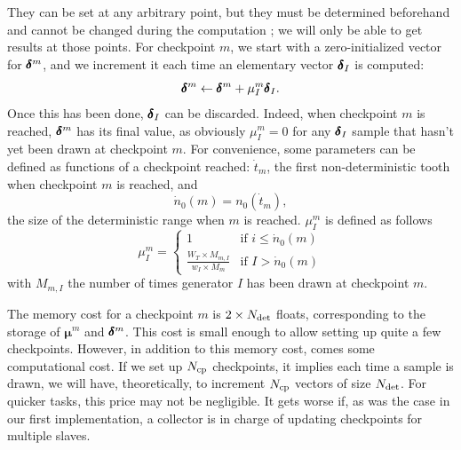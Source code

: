 \documentclass[./thesis.tex]{subfiles}
\begin{document}
They can be set at any arbitrary point, but they must be determined beforehand and cannot be changed during the computation ; we will only be able to get results at those points.
For checkpoint $m$, we start with a zero-initialized vector for $\pmb \delta^m$, and
we increment it each time an elementary vector $\pmb \delta_I$ is computed:
\begin{equation}
\pmb \delta^m \gets \pmb \delta^m + \mu_I^{m} \pmb \delta_I.
\end{equation}
Once this has been done, $\pmb \delta_I$ can be discarded. Indeed, when checkpoint $m$ is reached, $\pmb \delta^{m}$ has its final value, as obviously $\mu_I^{m} = 0$ for any $\pmb \delta_I$ sample that hasn't yet been drawn at checkpoint $m$.
For convenience, some parameters can be defined as functions of a checkpoint reached:
$\dot t_m$, the first non-deterministic tooth when checkpoint $m$ is reached, and
\begin{equation}
\dot n_0(m) = n_0(\dot t_m),
\end{equation}
the size of the deterministic range when $m$ is reached.
$\mu^m_I$ is defined as follows
\begin{equation}
\mu^m_I = 
\begin{cases}
1 & \text{if } i \leq \dot n_0(m) \\
\frac{W_T \times M_{m,I}}{w_I \times M_m} & \text{if } I > \dot n_0(m)
\end{cases}
\end{equation}
with $M_{m,I}$ the number of times generator $I$ has been drawn at checkpoint $m$.


The memory cost for a checkpoint $m$ is $2 \times {N_\text{det}}$ floats, corresponding to the storage of ${\pmb \mu}^m$ and $\pmb \delta^m$. This cost is small enough to allow setting up quite a few checkpoints. However, in addition to this memory cost, comes some computational cost. If we set up ${N_\text{cp}}$ checkpoints, it implies each time a sample is drawn, we will have, theoretically, to increment ${N_\text{cp}}$ vectors of size ${N_\text{det}}$. For quicker tasks, this price may not be negligible. It gets worse if, as was the case in our first implementation, a collector is in charge of updating checkpoints for multiple slaves. 
\end{document}
